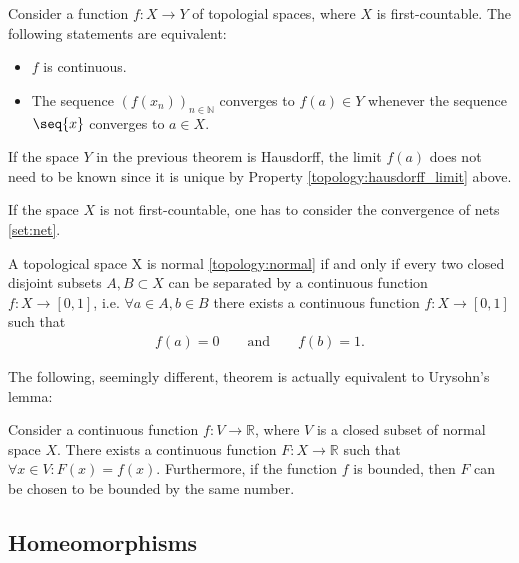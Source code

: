     \begin{property}[Continuity]
        Consider a function $f:X\rightarrow Y$ of topologial spaces, where $X$ is first-countable. The following statements are equivalent:
        \begin{itemize}
            \item $f$ is continuous.
            \item The sequence $(f(x_n))_{n\in\mathbb{N}}$ converges to $f(a)\in Y$ whenever the sequence $\seq{x}$ converges to $a\in X$.
        \end{itemize}
    \end{property}
    \begin{result}
       If the space $Y$ in the previous theorem is Hausdorff, the limit $f(a)$ does not need to be known since it is unique by Property \ref{topology:hausdorff_limit} above.
    \end{result}
    \begin{remark}
        If the space $X$ is not first-countable, one has to consider the convergence of nets \ref{set:net}.
    \end{remark}

    \begin{theorem}\label{topology:urysohns_lemma}
        A topological space X is normal \ref{topology:normal} if and only if every two closed disjoint subsets $A, B\subset X$ can be separated by a continuous function $f:X\rightarrow [0,1]$, i.e. $\forall a\in A,b\in B$ there exists a continuous function $f:X\rightarrow [0,1]$ such that
        \begin{gather}
            f(a) = 0\qquad\text{and}\qquad f(b) = 1.
        \end{gather}
    \end{theorem}
    The following, seemingly different, theorem is actually equivalent to Urysohn's lemma:
    \begin{theorem}
        Consider a continuous function $f:V\rightarrow\mathbb{R}$, where $V$ is a closed subset of normal space $X$. There exists a continuous function $F:X\rightarrow\mathbb{R}$ such that $\forall x\in V:F(x) = f(x)$. Furthermore, if the function $f$ is bounded, then $F$ can be chosen to be bounded by the same number.
    \end{theorem}

\subsection{Homeomorphisms}

